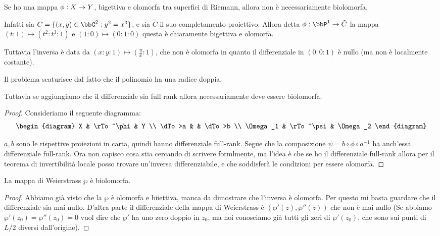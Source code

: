 
	Se ho una mappa $\phi: X \rightarrow Y$, bigettiva e olomorfa tra superfici di Riemann, allora non è necessariamente biolomorfa.
	
	Infatti sia $C = \{ (x,y) \in \bbC^2 : y^2=x^3 \}$, e sia $\tilde C$ il suo completamento proiettivo. Allora detta $\phi: \bbP^1 \rar \tilde C$ la mappa $ (t : 1) \mapsto (t^2 : t^3 : 1)$ e $(1 : 0) \mapsto (0:1:0)$ questa è chiaramente bigettiva e olomorfa.

	Tuttavia l'inversa è data da $(x:y:1) \mapsto (\frac yx:1)$, che non è olomorfa in quanto il differenziale in $(0:0:1)$ è nullo (ma non è localmente costante).
	
	Il problema scaturisce dal fatto che il polinomio ha una radice doppia.
	
	Tuttavia se aggiungiamo che il differenziale sia full rank allora necessariamente deve essere biolomorfa.
	\begin{proof}
		Consideriamo il seguente diagramma:
		\[
		\begin{diagram}
			X & \rTo^\phi & Y \\
			\dTo>a & & \dTo>b \\
			\Omega_1 & \rTo^\psi & \Omega_2
		\end{diagram}
		\]
		
		$a, b$ sono le rispettive proiezioni in carta, quindi hanno differenziale full-rank. Segue che la composizione $\psi = b\circ \phi \circ a^{-1}$ ha anch'essa differenziale full-rank.
		Ora non capisco cosa stia cercando di scrivere formlmente, ma l'idea è che se ho il differenziale full-rank allora per il teorema di invertibilità locale posso trovare un'inversa differenziabile, e che soddisferà le condizioni per essere olomorfa. %
	\end{proof}

	\begin{proposizione}
		La mappa di Weierstrass $\wp$ è biolomorfa. 
	\end{proposizione}
	\begin{proof}
		Abbiamo già visto che la $\wp$ è olomorfa e biiettiva, manca da dimostrare che l'inversa è olomorfa.
		Per questo mi basta guardare che il differenziale sia mai nullo. D'altra parte il differenziale della mappa di Weierstrass è $ (\wp'(z), \wp''(z))$ che non è mai nullo (Se abbiamo $\wp'(z_0) = \wp''(z_0) = 0$ vuol dire che $\wp'$ ha uno zero doppio in $z_0$, ma noi conosciamo già tutti gli zeri di $\wp'(z_0)$, che sono sui punti di $L/2$ diversi dall'origine).
	\end{proof}
	
